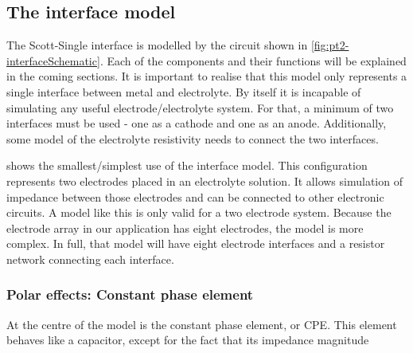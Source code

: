 



  \subsection{The interface model}


    The Scott-Single interface is modelled by the circuit shown in \cref{fig:pt2-interfaceSchematic}.
    Each of the components and their functions will be explained in the coming sections.
    It is important to realise that this model only represents a single interface between metal and electrolyte.
    By itself it is incapable of simulating any useful electrode/electrolyte system.
    For that, a minimum of two interfaces must be used - one as a cathode and one as an anode.
    Additionally, some model of the electrolyte resistivity needs to connect the two interfaces.


     shows the smallest/simplest use of the interface model.
    This configuration represents two electrodes placed in an electrolyte solution.
    It allows simulation of impedance between those electrodes and can be connected to other electronic circuits.
    A model like this is only valid for a two electrode system.
    Because the electrode array in our application has eight electrodes, the model is more complex.
    In full, that model will have eight electrode interfaces and a resistor network connecting each interface.

    \subsubsection{Polar effects: Constant phase element}
      At the centre of the model is the constant phase element, or CPE.
      This element behaves like a capacitor, except for the fact that its impedance magnitude

